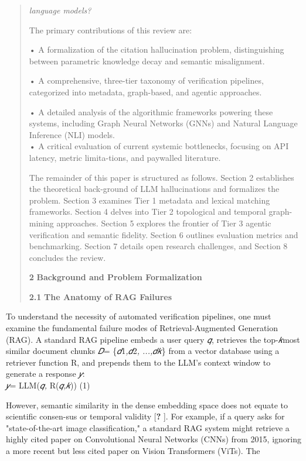\documentclass[
]{article}
\begin{document}
\begin{quote}
\emph{language models?}

The primary contributions of this review are:

• A formalization of the citation hallucination problem, distinguishing
between parametric knowledge decay and semantic misalignment.

• A comprehensive, three-tier taxonomy of verification pipelines,
categorized into metadata, graph-based, and agentic approaches.

• A detailed analysis of the algorithmic frameworks powering these
systems, including Graph Neural Networks (GNNs) and Natural Language
Inference (NLI) models.\\
• A critical evaluation of current systemic bottlenecks, focusing on API
latency, metric limita-tions, and paywalled literature.

The remainder of this paper is structured as follows. Section 2
establishes the theoretical back-ground of LLM hallucinations and
formalizes the problem. Section 3 examines Tier 1 metadata and lexical
matching frameworks. Section 4 delves into Tier 2 topological and
temporal graph-mining approaches. Section 5 explores the frontier of
Tier 3 agentic verification and semantic fidelity. Section 6 outlines
evaluation metrics and benchmarking. Section 7 details open research
challenges, and Section 8 concludes the review.

\textbf{2} \textbf{Background and Problem Formalization}

\textbf{2.1} \textbf{The Anatomy of RAG Failures}
\end{quote}

To understand the necessity of automated verification pipelines, one
must examine the fundamental failure modes of Retrieval-Augmented
Generation (RAG). A standard RAG pipeline embeds a user query \emph{𝑞},
retrieves the top-\emph{𝑘}most similar document chunks \emph{𝐷}=
\{\emph{𝑑}1\emph{,𝑑}2\emph{, ...,𝑑𝑘}\} from a vector database using a
retriever function R, and prepends them to the LLM's context window to
generate a response \emph{𝑦}:\\
\emph{𝑦}= LLM(\emph{𝑞,} R(\emph{𝑞,𝑘})) (1)

However, semantic similarity in the dense embedding space does not
equate to scientific consen-sus or temporal validity {[}\textbf{?} {]}.
For example, if a query asks for "state-of-the-art image
classification," a standard RAG system might retrieve a highly cited
paper on Convolutional Neural Networks (CNNs) from 2015, ignoring a more
recent but less cited paper on Vision Transformers (ViTs). The
\end{document}
